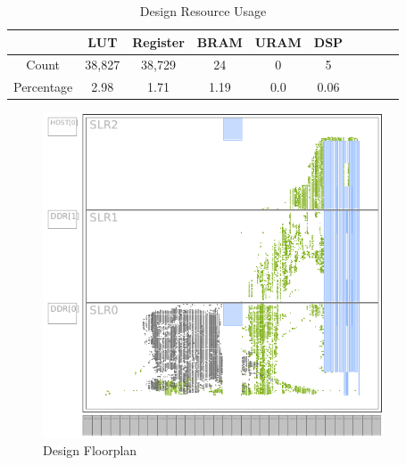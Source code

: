 \appendix


\begin{table}[H]
	\centering
	\begin{tabular}{c|ccccccccc}
		& \textbf{LUT} & \textbf{Register} & \textbf{BRAM} & \textbf{URAM} & \textbf{DSP} \\
		\hline
		Count & 38,827 & 38,729 & 24 & 0 & 5 \\
		Percentage & 2.98 & 1.71 & 1.19 & 0.0 & 0.06 \\
	\end{tabular}
	\caption{Design Resource Usage}
	\label{table:resource-usage}
\end{table}

\begin{figure}[H]
	\includegraphics[width=0.9\textwidth]{floorplan}
	\caption{Design Floorplan}
	\label{fig:floorplan}
\end{figure}
